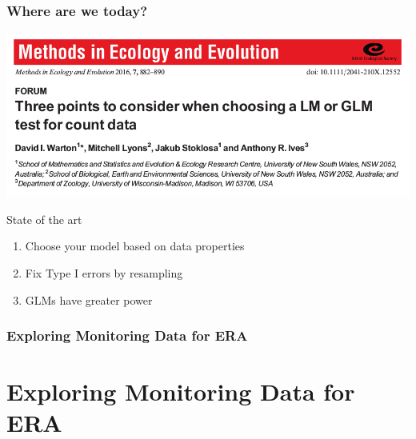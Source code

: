 \documentclass[
	12pt
	]{beamer}
\begin{document}
\begin{frame}
\frametitle{Where are we today?}
	\includegraphics[width=\textwidth]{figs/tikz/glm_hist/warton_2016.png}
	\pause
	\vspace*{-5mm}
	\begin{exampleblock}{State of the art}
		\begin{enumerate}
			\item Choose your model based on data properties
			\item Fix Type I errors by resampling
			\item GLMs have greater power 
		\end{enumerate}
	\end{exampleblock}
\end{frame}




\begingroup
\footnotesize %
\begin{frame}
\frametitle{Exploring Monitoring Data for ERA}
    \vspace*{5mm}
	\resizebox{1.1\textwidth}{!}{
		\hspace*{-20mm}
	}
\end{frame}
\endgroup



\section{Exploring Monitoring Data for ERA}
\end{document}

